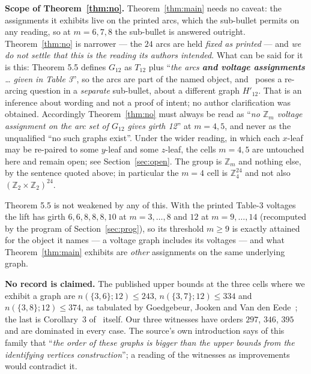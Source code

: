 \documentclass[11pt]{amsart}
\theoremstyle{remark}
\newcommand{\Zm}{\mathbb{Z}_m}
\newcommand{\Gt}{G_{12}}
\newcommand{\Tt}{T_{12}}
\begin{document}
\medskip
\noindent\textbf{Scope of Theorem~\ref{thm:no}.} Theorem~\ref{thm:main} needs no
caveat: the assignments it exhibits live on the printed arcs, which the
sub-bullet permits on any reading, so at $m = 6, 7, 8$ the sub-bullet is
answered outright. Theorem~\ref{thm:no} is narrower --- the $24$ arcs are held
\emph{fixed as printed} --- and \emph{we do not settle that this is the reading
its authors intended}. What can be said for it is this: Theorem 5.5 defines
$\Gt$ as $\Tt$ plus ``\emph{the arcs \textbf{and voltage assignments} \dots
given in Table 3}'', so the arcs are part of the named object, and~\cite{AAB}
poses a re-arcing question in a \emph{separate} sub-bullet, about a different
graph $H'_{12}$. That is an inference about wording and not a proof of intent;
no author clarification was obtained. Accordingly Theorem~\ref{thm:no} must
always be read as ``\emph{no $\Zm$ voltage assignment on the arc set of $\Gt$
gives girth 12}'' at $m = 4, 5$, and never as the unqualified ``no such graphs
exist''. Under the wider reading, in which each $x$-leaf may be re-paired to
some $y$-leaf and some $z$-leaf, the cells $m = 4, 5$ are untouched here and
remain open; see Section~\ref{sec:open}. The group is $\Zm$ and nothing else, by
the sentence quoted above; in particular the $m=4$ cell is $\mathbb{Z}_4^{24}$
and not also $(\mathbb{Z}_2 \times \mathbb{Z}_2)^{24}$.

\medskip
\noindent Theorem 5.5 is not weakened by any of this. With the printed Table-3
voltages the lift has girth $6,6,8,8,8,10$ at $m = 3,\dots,8$ and $12$ at
$m = 9,\dots,14$ (recomputed by the program of Section~\ref{sec:prog}), so its
threshold $m \ge 9$ is exactly attained for the object it names --- a voltage
graph includes its voltages --- and what Theorem~\ref{thm:main} exhibits are
\emph{other} assignments on the same underlying graph.

\medskip
\noindent\textbf{No record is claimed.} The published upper bounds at the three
cells where we exhibit a graph are $n(\{3,6\};12) \le 243$,
$n(\{3,7\};12) \le 334$ and $n(\{3,8\};12) \le 374$, as tabulated by
Goedgebeur, Jooken and Van den Eede~\cite[girth-$12$ rows of its bound
table]{GJV}; the last is Corollary~3 of~\cite{AAB} itself. Our three witnesses
have orders $297$, $346$, $395$ and are dominated in every case. The source's
own introduction says of this family that ``\emph{the order of these graphs is
bigger than the upper bounds from the identifying vertices construction}''; a
reading of the witnesses as improvements would contradict it.
\end{document}
